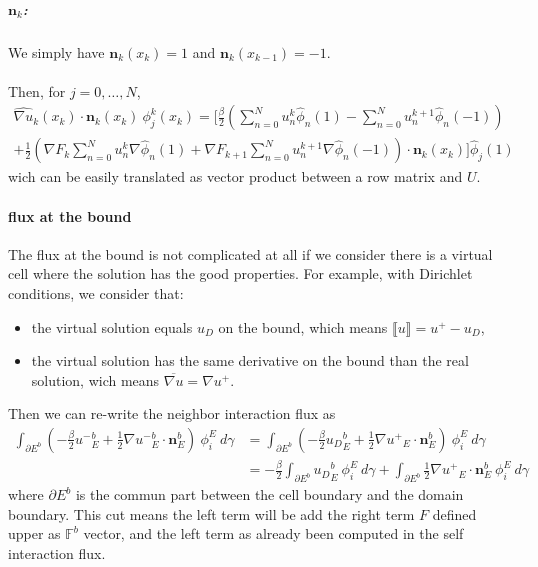 \documentclass[a4paper,10pt,draft]{article}
\begin{document}
\subparagraph{$\mathbf{n}_k$:} We simply have $\mathbf{n}_k(x_k) = 1$ and $\mathbf{n}_k(x_{k-1}) = 
-1$.

\paragraph{}

Then, for $j=0,\dots,N$,
\begin{multline*}
 \widehat{\nabla u}_k(x_k) \cdot \mathbf{n}_k(x_k)\ \phi_j^k(x_k) 
 = \Bigg[ \frac{\beta}{2} \left( \sum_{n=0}^N u_n^k \hat \phi_n(1) - \sum_{n=0}^N u_n^{k+1} 
\hat 
\phi_n(-1) \right) 
\\+ \frac{1}{2} \left(\nabla F_k \sum_{n=0}^N u_n^k \nabla \hat \phi_n(1) + \nabla F_{k+1} 
\sum_{n=0}^N u_n^{k+1} \nabla \hat \phi_n(-1) \right) \cdot \mathbf{n}_k(x_k) \Bigg] 
\hat \phi_j(1)
\end{multline*}
wich can be easily translated as vector product between a row matrix and $U$.

\vspace{10cm}

\paragraph{flux at the bound}
The flux at the bound is not complicated at all if we consider there is a virtual cell where the 
solution has the good properties. For example, with Dirichlet conditions, we consider that:
\begin{itemize}
 \item the virtual solution equals $u_D$ on the bound, which means $\llbracket u \rrbracket = u^+ 
- u_D$,
 \item the virtual solution has the same derivative on the bound than the real solution, wich means 
$\overline{\nabla u} = \nabla u^+$.
\end{itemize}

Then we can re-write the neighbor interaction flux as
\begin{align*}
 \int_{\partial E^b} \left( -\frac{\beta}{2} {u^-}_E^b + \frac{1}{2} \nabla {u^-}_E^b \cdot 
\mathbf{n}_E^b \right) \ \phi_i^E\ d\gamma
&= \int_{\partial E^b} \left( -\frac{\beta}{2} {u_D}_E^b + \frac{1}{2} \nabla {u^+}_E \cdot 
\mathbf{n}_E^b \right) \ \phi_i^E\ d\gamma \\
&= -\frac{\beta}{2} \int_{\partial E^b} {u_D}_E^b \ \phi_i^E\ d\gamma + \int_{\partial E^b} 
\frac{1}{2} \nabla {u^+}_E \cdot \mathbf{n}_E^b\ \phi_i^E\ d\gamma 
\end{align*}
where $\partial E^b$ is the commun part between the cell boundary and the domain boundary.
This cut means the left term will be add the right term $F$ defined upper as $\mathbb{F}^b$ vector, 
and the left term as already been computed in the self interaction flux.
\end{document}
